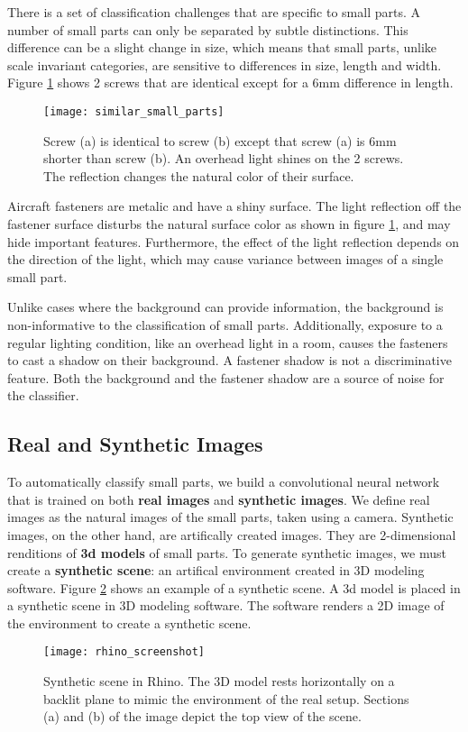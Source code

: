 There is a set of classification challenges that are specific to small parts. A number of small parts can only be separated by subtle distinctions. This difference can be a slight change in size, which means that small parts, unlike scale invariant categories, are sensitive to differences in size, length and width. Figure \ref{fig:similar_small_parts} shows 2 screws that are identical except for a 6mm difference in length.

\begin{figure}[h]
\centering
  \texttt{[image: similar\_small\_parts]}
\caption{Screw (a) is identical to screw (b) except that screw (a) is 6mm shorter than screw (b). An overhead light shines on the 2 screws. The reflection changes the natural color of their surface.}
\label{fig:similar_small_parts}
\end{figure}

Aircraft fasteners are metalic and have a shiny surface. The light reflection off the fastener surface disturbs the natural surface color as shown in figure \ref{fig:similar_small_parts}, and may hide important features. Furthermore, the effect of the light reflection depends on the direction of the light, which may cause variance between images of a single small part.

Unlike cases where the background can provide information, the background is non-informative to the classification of small parts. Additionally, exposure to a regular lighting condition, like an overhead light in a room, causes the fasteners to cast a shadow on their background. A fastener shadow is not a discriminative feature. Both the background and the fastener shadow are a source of noise for the classifier.

\subsection{Real and Synthetic Images}
To automatically classify small parts, we build a convolutional neural network that is trained on both \textbf{real images} and \textbf{synthetic images}. We define real images as the natural images of the small parts, taken using a camera. Synthetic images, on the other hand, are artifically created images. They are 2-dimensional renditions of \textbf{3d models} of small parts. To generate synthetic images, we must create a \textbf{synthetic scene}: an artifical environment created in 3D modeling software. Figure \ref{fig:synthetic_scene} shows an example of a synthetic scene. A 3d model is placed in a synthetic scene in 3D modeling software. The software renders a 2D image of the environment to create a synthetic scene.

\begin{figure}[h]
\centering
  \texttt{[image: rhino\_screenshot]}
\caption{Synthetic scene in Rhino. The 3D model rests horizontally on a backlit plane to mimic the environment of the real setup. Sections (a) and (b) of the image depict the top view of the scene.}
\label{fig:synthetic_scene}
\end{figure}
